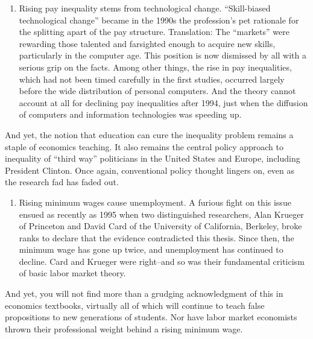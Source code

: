 \documentclass[
]{book}
\providecommand{\tightlist}{%
  \setlength{\itemsep}{0pt}\setlength{\parskip}{0pt}}
\begin{document}
\begin{enumerate}
\def\labelenumi{\arabic{enumi}.}
\setcounter{enumi}{2}
\tightlist
\item
  Rising pay inequality stems from technological change. ``Skill-biased technological change'' became in the 1990s the profession's pet rationale for the splitting apart of the pay structure. Translation: The ``markets'' were rewarding those talented and farsighted enough to acquire new skills, particularly in the computer age. This position is now dismissed by all with a serious grip on the facts. Among other things, the rise in pay inequalities, which had not been timed carefully in the first studies, occurred largely before the wide distribution of personal computers. And the theory cannot account at all for declining pay inequalities after 1994, just when the diffusion of computers and information technologies was speeding up.
\end{enumerate}

And yet, the notion that education can cure the inequality problem remains a staple of economics teaching. It also remains the central policy approach to inequality of ``third way'' politicians in the United States and Europe, including President Clinton. Once again, conventional policy thought lingers on, even as the research fad has faded out.

\begin{enumerate}
\def\labelenumi{\arabic{enumi}.}
\setcounter{enumi}{3}
\tightlist
\item
  Rising minimum wages cause unemployment. A furious fight on this issue ensued as recently as 1995 when two distinguished researchers, Alan Krueger of Princeton and David Card of the University of California, Berkeley, broke ranks to declare that the evidence contradicted this thesis. Since then, the minimum wage has gone up twice, and unemployment has continued to decline. Card and Krueger were right--and so was their fundamental criticism of basic labor market theory.
\end{enumerate}

And yet, you will not find more than a grudging acknowledgment of this in economics textbooks, virtually all of which will continue to teach false propositions to new generations of students. Nor have labor market economists thrown their professional weight behind a rising minimum wage.
\end{document}
